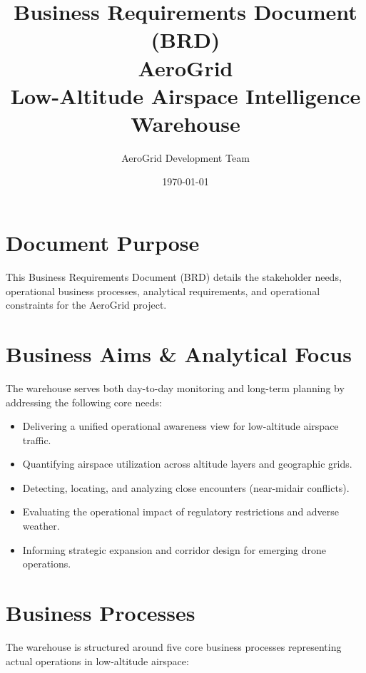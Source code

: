 \documentclass[11pt,a4paper]{article}
\title{\textbf{Business Requirements Document (BRD)}\\[0.5cm] \textbf{AeroGrid}\\[0.3cm] Low-Altitude Airspace Intelligence Warehouse}
\author{AeroGrid Development Team}
\date{\today}
\begin{document}
\maketitle

\section{Document Purpose}
This Business Requirements Document (BRD) details the stakeholder needs, operational business processes, analytical requirements, and operational constraints for the AeroGrid project.

\section{Business Aims \& Analytical Focus}
The warehouse serves both day-to-day monitoring and long-term planning by addressing the following core needs:
\begin{itemize}
    \item Delivering a unified operational awareness view for low-altitude airspace traffic.
    \item Quantifying airspace utilization across altitude layers and geographic grids.
    \item Detecting, locating, and analyzing close encounters (near-midair conflicts).
    \item Evaluating the operational impact of regulatory restrictions and adverse weather.
    \item Informing strategic expansion and corridor design for emerging drone operations.
\end{itemize}

\section{Business Processes}
The warehouse is structured around five core business processes representing actual operations in low-altitude airspace:
\end{document}
